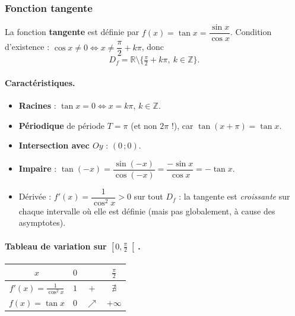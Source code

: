 \documentclass[11pt,a4paper]{article}
\newcommand{\R}{\mathbb{R}}
\newcommand{\Z}{\mathbb{Z}}
\newcommand{\Df}{D_f}
\newcommand{\croit}{\textcolor{varcol}{\Large$\nearrow$}}
\begin{document}
\subsubsection{Fonction tangente}

\begin{definition}
La fonction \textbf{tangente} est définie par
$f(x)=\tan x = \dfrac{\sin x}{\cos x}$.
Condition d'existence : $\cos x\neq 0 \Leftrightarrow x\neq\dfrac{\pi}{2}+k\pi$, donc
\[
  \Df=\R\setminus\Big\{\tfrac{\pi}{2}+k\pi,\ k\in\Z\Big\}.
\]
\end{definition}

\paragraph{Caractéristiques.}
\begin{itemize}[leftmargin=1.5em,topsep=2pt,itemsep=2pt]
  \item \textbf{Racines} : $\tan x=0 \Leftrightarrow x=k\pi$, $k\in\Z$.
  \item \textbf{Périodique} de période $T=\pi$ (et non $2\pi$ !), car $\tan(x+\pi)=\tan x$.
  \item \textbf{Intersection avec $Oy$} : $(0\,;0)$.
  \item \textbf{Impaire} : $\tan(-x)=\dfrac{\sin(-x)}{\cos(-x)}=\dfrac{-\sin x}{\cos x}=-\tan x$.
  \item Dérivée : $f'(x)=\dfrac{1}{\cos^2 x}>0$ sur tout $\Df$ : la tangente est
        \emph{croissante} sur chaque intervalle où elle est définie (mais pas globalement,
        à cause des asymptotes).
\end{itemize}

\paragraph{Tableau de variation sur $\left[0,\tfrac{\pi}{2}\right[$.}
\begin{center}
\renewcommand{\arraystretch}{1.6}\setlength{\tabcolsep}{14pt}
\begin{tabular}{|c|ccc|}
\hline
\rowcolor{primarylight}
$x$ & $0$ & & $\tfrac{\pi}{2}$ \\
\hline
$f'(x)=\tfrac{1}{\cos^2 x}$ & $1$ & $+$ & $\nexists$ \\
\hline
$f(x)=\tan x$ & $0$ & \croit & $+\infty$ \\
\hline
\end{tabular}
\end{center}
\end{document}
